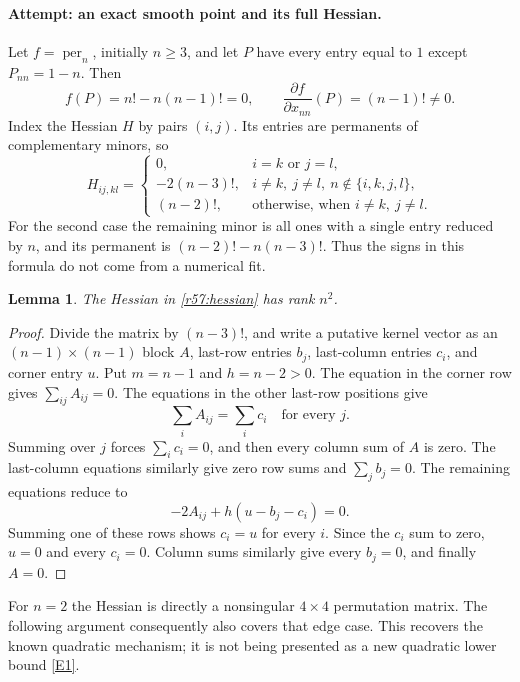 \documentclass[11pt,a4paper]{article}
\newcommand{\eref}[2]{\hyperlink{extra:#1:#2}{[E#2]}}
\newtheorem{notebooklemma}{Lemma}[section]
\numberwithin{equation}{section}
\begin{document}
\paragraph{Attempt: an exact smooth point and its full Hessian.}
Let $f=\operatorname{per}_n$, initially $n\geq3$, and let $P$ have every entry equal to $1$ except $P_{nn}=1-n$. Then
\[
 f(P)=n!-n(n-1)!=0,
 \qquad \frac{\partial f}{\partial x_{nn}}(P)=(n-1)!\ne0.
\]
Index the Hessian $H$ by pairs $(i,j)$. Its entries are permanents of complementary minors, so
\begin{equation}\label{r57:hessian}
 H_{ij,kl}=\begin{cases}
 0,&i=k\text{ or }j=l,\\
 -2(n-3)!,&i\ne k,\ j\ne l,\ n\notin\{i,k,j,l\},\\
 (n-2)!,&\text{otherwise, when }i\ne k,\ j\ne l.
 \end{cases}
\end{equation}
For the second case the remaining minor is all ones with a single entry reduced by $n$, and its permanent is $(n-2)!-n(n-3)!$. Thus the signs in this formula do not come from a numerical fit.

\begin{notebooklemma}\label{r57:fullrank}
The Hessian in \eqref{r57:hessian} has rank $n^2$.
\end{notebooklemma}
\begin{proof}
Divide the matrix by $(n-3)!$, and write a putative kernel vector as an $(n-1)\times(n-1)$ block $A$, last-row entries $b_j$, last-column entries $c_i$, and corner entry $u$. Put $m=n-1$ and $h=n-2>0$. The equation in the corner row gives $\sum_{ij}A_{ij}=0$. The equations in the other last-row positions give
\[
 \sum_i A_{ij}=\sum_i c_i\quad\text{for every }j.
\]
Summing over $j$ forces $\sum_i c_i=0$, and then every column sum of $A$ is zero. The last-column equations similarly give zero row sums and $\sum_jb_j=0$. The remaining equations reduce to
\[
 -2A_{ij}+h(u-b_j-c_i)=0.
\]
Summing one of these rows shows $c_i=u$ for every $i$. Since the $c_i$ sum to zero, $u=0$ and every $c_i=0$. Column sums similarly give every $b_j=0$, and finally $A=0$.
\end{proof}

For $n=2$ the Hessian is directly a nonsingular $4\times4$ permutation matrix. The following argument consequently also covers that edge case. This recovers the known quadratic mechanism; it is not being presented as a new quadratic lower bound \eref{30006699}{1}.
\end{document}
